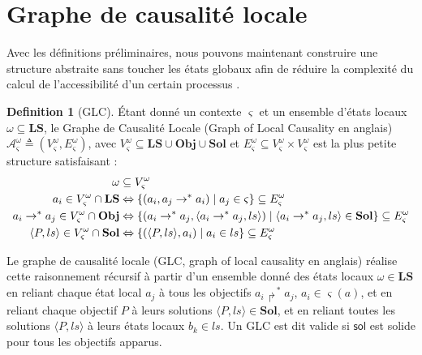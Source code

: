 \documentclass[11pt]{report}
\theoremstyle{definition}
\newtheorem{Def}{Definition}[chapter]
\begin{document}
\section{Graphe de causalit\'e locale}
Avec les d\'efinitions pr\'eliminaires, nous pouvons maintenant construire une structure abstraite sans toucher les \'etats globaux afin de r\'eduire la complexit\'e du calcul de l'accessibilit\'e d'un certain processus \citep{Pauleve2013}.
\begin{Def}[GLC]
\'Etant donn\'e un contexte $\varsigma$ et un ensemble d'\'etats locaux $\omega\subseteq \mathbf{LS}$, le Graphe de Causalit\'e Locale (Graph of Local Causality en anglais) $\mathcal{A}^\omega_\varsigma\triangleq(V^\omega_\varsigma,E^\omega_\varsigma)$, avec $V^\omega_\varsigma\subseteq \mathbf{LS\cup Obj\cup Sol}$ et $E^\omega_\varsigma\subseteq V^\omega_\varsigma\times V^\omega_\varsigma$ est la plus petite structure satisfaisant :
\begin{equation}
\centering
\begin{aligned}
\omega&\subseteq V^\omega_\varsigma\\
a_i\in V^\omega_\varsigma\cap\mathbf{LS}&\Leftrightarrow\{(a_i,a_j\to^*a_i)\mid a_j\in\varsigma\}\subseteq E^\omega_\varsigma\\
a_i\to^*a_j\in V^\omega_\varsigma\cap\mathbf{Obj}&\Leftrightarrow\{(a_i\to^*a_j,\langle a_i\to^*a_j,ls\rangle)\mid\langle a_i\to^*a_j,ls\rangle\in \mathbf{Sol}\}\subseteq E^\omega_\varsigma\\
\langle P,ls\rangle\in V^\omega_\varsigma\cap\mathbf{Sol}&\Leftrightarrow\{(\langle P,ls\rangle,a_i)\mid a_i\in ls\}\subseteq E^\omega_\varsigma\nonumber
\end{aligned}
\end{equation}
\end{Def}
Le graphe de causalit\'e locale (GLC, graph of local causality en anglais) r\'ealise cette raisonnement r\'ecursif \`a partir d'un ensemble donn\'e des \'etats locaux $\omega\in\mathbf{LS}$ en reliant chaque \'etat local $a_j$ \`a tous les objectifs $a_i\Rsh^*a_j$, $a_i\in\varsigma(a)$, et en reliant chaque objectif $P$ \`a leurs solutions $\langle P,ls\rangle\in\mathbf{Sol}$, et en reliant toutes les solutions $\langle P,ls\rangle$ \`a leurs \'etats locaux $b_k\in ls$. Un GLC est dit valide si $\mathsf{sol}$ est solide pour tous les objectifs apparus.
\end{document}
